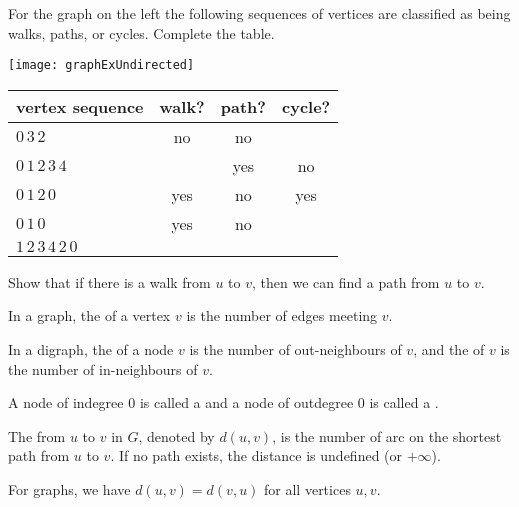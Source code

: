 \begin{Boxample}
For the graph on the left the following
sequences of vertices are classified as being walks, paths, or cycles. Complete the table.

\begin{minipage}[c]{0.3\textwidth}
\centering
\texttt{[image: graphExUndirected]}
\end{minipage}
\begin{minipage}[c]{0.65\textwidth}
\begin{tabular}{|l|c|c|c|}\hline
\textbf{vertex sequence} & \textbf{walk?} & \textbf{path?} & \textbf{cycle?} \\ \hline
$0\, 3\, 2$                  & no  & no  &   \\
$0\, 1\, 2\, 3\, 4$          &  & yes & no  \\
$0\, 1\,  2\,  0$            & yes & no  & yes  \\
$0 \, 1\,  0$                & yes & no  &  \\
$1\,  2\,  3\,  4\,  2\,  0$ &     &     &  \\
\hline
\end{tabular}
\end{minipage}
\end{Boxample}

\begin{Boxample}[8]
Show that if there is a walk from $u$ to $v$, then we can find a path from $u$ to $v$.
\end{Boxample}


\begin{Definition} 
In a graph, the  of a vertex $v$ is the number of edges meeting $v$. 

In a digraph, the  of a node $v$ is the number of out-neighbours of $v$, 
and the  of $v$ is the number of in-neighbours of $v$.

A node of indegree $0$ is called a  and a node of outdegree $0$ is called a .
\end{Definition}


\begin{Definition}
The  from $u$ to $v$ in $G$, denoted by $d(u,v)$, is 
the number of arc on the shortest path from $u$ to $v$. If no path exists, the 
distance is undefined (or $+\infty$).
\end{Definition}

For graphs, we have $d(u,v) = d(v,u)$ for all vertices $u, v$. 

